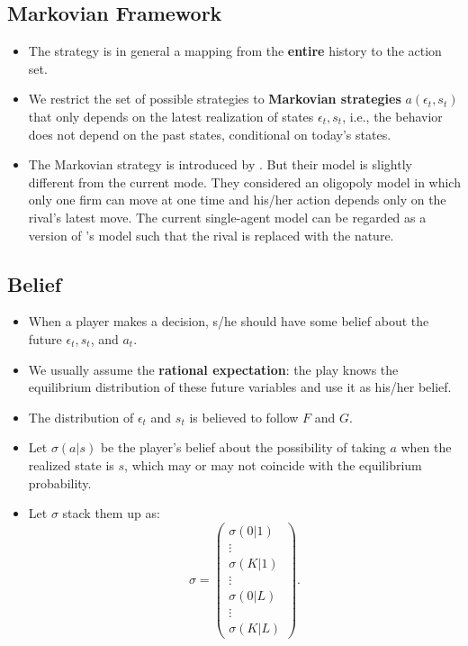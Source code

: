 \documentclass[
]{book}
\providecommand{\tightlist}{%
  \setlength{\itemsep}{0pt}\setlength{\parskip}{0pt}}
\begin{document}
\hypertarget{markovian-framework}{%
\subsection{Markovian Framework}\label{markovian-framework}}

\begin{itemize}
\tightlist
\item
  The strategy is in general a mapping from the \textbf{entire} history to the action set.
\item
  We restrict the set of possible strategies to \textbf{Markovian strategies} \(a(\epsilon_t, s_t)\) that only depends on the latest realization of states \(\epsilon_t, s_t\), i.e., the behavior does not depend on the past states, conditional on today's states.
\item
  The Markovian strategy is introduced by \citet{maskinTheoryDynamicOligopoly1988}. But their model is slightly different from the current mode. They considered an oligopoly model in which only one firm can move at one time and his/her action depends only on the rival's latest move. The current single-agent model can be regarded as a version of \citet{maskinTheoryDynamicOligopoly1988}'s model such that the rival is replaced with the nature.
\end{itemize}

\hypertarget{belief}{%
\subsection{Belief}\label{belief}}

\begin{itemize}
\tightlist
\item
  When a player makes a decision, s/he should have some belief about the future \(\epsilon_t, s_t\), and \(a_t\).
\item
  We usually assume the \textbf{rational expectation}: the play knows the equilibrium distribution of these future variables and use it as his/her belief.
\item
  The distribution of \(\epsilon_t\) and \(s_t\) is believed to follow \(F\) and \(G\).
\item
  Let \(\sigma(a|s)\) be the player's belief about the possibility of taking \(a\) when the realized state is \(s\), which may or may not coincide with the equilibrium probability.
\item
  Let \(\sigma\) stack them up as:
  \begin{equation}
  \sigma = 
  \begin{pmatrix}
  \sigma(0|1)\\
  \vdots\\
  \sigma(K|1)\\
  \vdots\\ 
  \sigma(0|L)\\
  \vdots\\ 
  \sigma(K|L)
  \end{pmatrix}.
  \end{equation}
\end{itemize}
\end{document}
